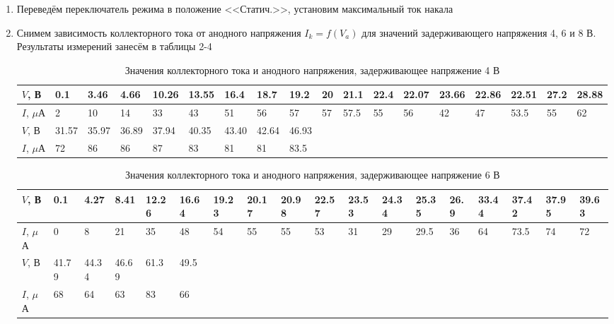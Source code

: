 \documentclass[a4paper]{article}
\begin{document}
\begin{enumerate}
    \item Переведём переключатель режима в положение <<Статич.>>, установим максимальный ток накала
    \item Снимем зависимость коллекторного тока от анодного напряжения $I_k = f(V_a)$ для значений задерживающего напряжения 4, 6 и 8 В. Результаты измерений занесём в таблицы 2-4
    
    \begin{table}[h]
    \centering
    \begin{center}
    \caption{Значения коллекторного тока и анодного напряжения, задерживающее напряжение 4 В}
    \end{center}
    \vspace{0.1cm}
    \label{tab:my_label}
    \begin{tabular}{ |p{1cm}||p{0.6cm}|p{0.6cm}|p{0.6cm}|p{0.6cm}|p{0.6cm}|p{0.6cm}|p{0.6cm}|p{0.6cm}|p{0.6cm}|p{0.6cm}|p{0.6cm}|p{0.6cm}|p{0.6cm}|p{0.6cm}|p{0.6cm}|p{0.6cm}|p{0.6cm}|}
 \hline
$V$, В & 0.1 & 3.46 & 4.66 & 10.26 & 13.55 & 16.4 & 18.7 & 19.2 & 20 & 21.1 & 22.4 & 22.07 & 23.66 & 22.86 & 22.51 & 27.2 & 28.88\\
 \hline
 $I$, $\mu$А & 2 & 10 & 14 & 33 & 43 & 51 & 56 & 57 & 57 & 57.5 & 55 & 56 & 42 & 47 & 53.5 & 55 & 62\\
\hline
\hline
$V$, В & 31.57 & 35.97 & 36.89 & 37.94 & 40.35 & 43.40 & 42.64 & 46.93 &  &  &  &  &  &  &  &  & \\
\hline
$I$, $\mu$А & 72 & 86 & 86 & 87 & 83 & 81 & 81 & 83.5 &  &  &  &  &  &  & &  & \\
\hline
 
\end{tabular}
\end{table}

    \begin{table}[h]
    \centering
    \begin{center}
    \caption{Значения коллекторного тока и анодного напряжения, задерживающее напряжение 6 В}
    \end{center}
    \vspace{0.1cm}
    \label{tab:my_label}
    \begin{tabular}{ |p{1cm}||p{0.6cm}|p{0.6cm}|p{0.6cm}|p{0.6cm}|p{0.6cm}|p{0.6cm}|p{0.6cm}|p{0.6cm}|p{0.6cm}|p{0.6cm}|p{0.6cm}|p{0.6cm}|p{0.6cm}|p{0.6cm}|p{0.6cm}|p{0.6cm}|p{0.6cm}|}
 \hline
$V$, В & 0.1 & 4.27 & 8.41 & 12.26 & 16.64 & 19.23 & 20.17 & 20.98 & 22.57 & 23.53 & 24.34 & 25.35 & 26.9 & 33.44 & 37.42 & 37.95 & 39.63\\
 \hline
 $I$, $\mu$А & 0 & 8 & 21 & 35 & 48 & 54 & 55 & 55 & 53 & 31 & 29 & 29.5 & 36 & 64 & 73.5 & 74 & 72\\
\hline
\hline
$V$, В & 41.79 & 44.34 & 46.69 & 61.3 & 49.5 &  &  &  &  &  &  &  &  &  &  &  & \\
\hline
$I$, $\mu$А & 68 & 64 & 63 & 83 & 66 &  &  & &  &  &  &  &  &  &  &  & \\
\hline


\end{tabular}
\end{table}
\end{enumerate}
\end{document}
